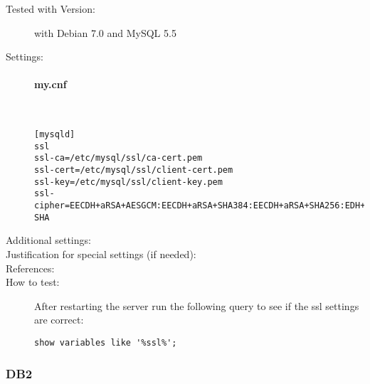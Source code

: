 \begin{description}
\item[Tested with Version:] with Debian 7.0 and MySQL 5.5

\item[Settings:] \mbox{}

\paragraph*{my.cnf}\mbox{}\\

\begin{lstlisting}[breaklines]
[mysqld]
ssl
ssl-ca=/etc/mysql/ssl/ca-cert.pem
ssl-cert=/etc/mysql/ssl/client-cert.pem
ssl-key=/etc/mysql/ssl/client-key.pem
ssl-cipher=EECDH+aRSA+AESGCM:EECDH+aRSA+SHA384:EECDH+aRSA+SHA256:EDH+CAMELLIA256:EECDH:EDH+aRSA:+SSLv3:!aNULL:!eNULL:!LOW:!3DES:!MD5:!EXP:!PSK:!SRP:!DSS:!RC4:!SEED:!AES128:!CAMELLIA128:!ECDSA:AES256-SHA
\end{lstlisting}

\item[Additional settings:]


\item[Justification for special settings (if needed):]


\item[References:]



\item[How to test:]

After restarting the server run the following query to see if the ssl settings are correct:
\begin{lstlisting}[breaklines]
show variables like '%ssl%';
\end{lstlisting}


\end{description}






\subsubsection{DB2}





